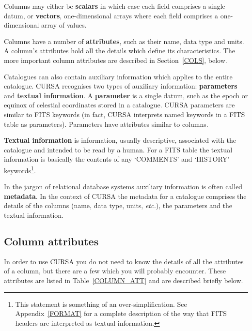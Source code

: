 \documentclass[twoside,11pt]{article}
\renewcommand{\_}{\texttt{\symbol{95}}}
\begin{document}
Columns may either be {\bf scalars} in which case each field comprises
a single datum, or {\bf vectors}, one-dimensional arrays where each
field comprises a one-dimensional array of values.

Columns have a number of {\bf attributes}, such as their name, data type
and units. A column's attributes hold all the details which define its
characteristics.  The more important column attributes are described
in Section~\ref{COLS}, below.

Catalogues can also contain auxiliary information which applies to the
entire catalogue. CURSA recognises two types of auxiliary information:
{\bf parameters} and {\bf textual information}. A {\bf parameter} is
a single datum, such as the epoch or equinox of celestial coordinates stored
in a catalogue. CURSA parameters are similar to FITS keywords (in
fact, CURSA interprets named keywords in a FITS table as parameters).
Parameters have attributes similar to columns.

{\bf Textual information} is information, usually descriptive,
associated with the catalogue and intended to be read by a human. For a
FITS table the textual information is basically the contents of any
`COMMENTS' and `HISTORY' keywords\footnote{This statement is something
of an over-simplification. See Appendix~\ref{FORMAT} for a complete
description of the way that FITS headers are interpreted as textual
information.}.

In the jargon of relational database systems auxiliary information is
often called {\bf metadata}.  In the context of CURSA the metadata for
a catalogue comprises the details of the columns (name, data type,
units, \emph{etc.}), the parameters and the textual information.


\subsection{\label{COLS}Column attributes}

In order to use CURSA you do not need to know the details of all the
attributes of a column, but there are a few which you will probably
encounter. These attributes are listed in Table~\ref{COLUMN_ATT} and are
described briefly below.
\end{document}

